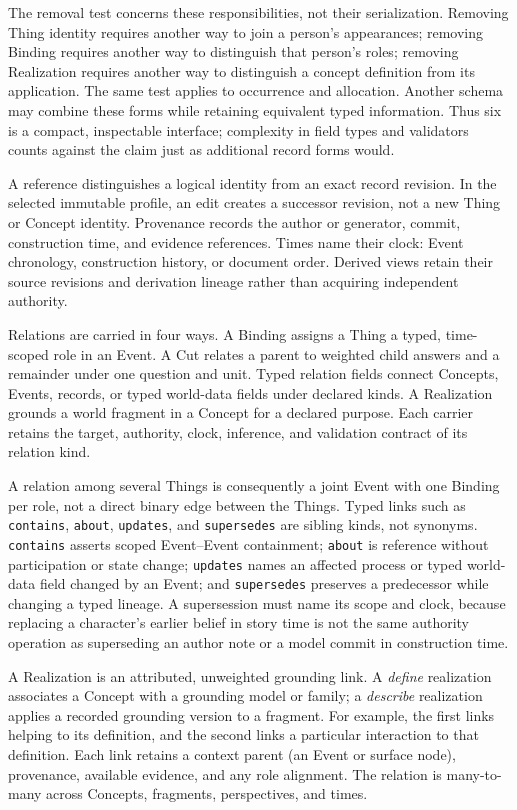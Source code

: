 \documentclass[11pt,a4paper]{article}
\begin{document}
The removal test concerns these responsibilities, not their serialization.
Removing Thing identity requires another way to join a person's appearances;
removing Binding requires another way to distinguish that person's roles;
removing Realization requires another way to distinguish a concept definition
from its application. The same test applies to occurrence and allocation.
Another schema may combine these forms while retaining equivalent typed
information. Thus six is a compact, inspectable interface; complexity in field types and validators counts
against the claim just as additional record forms would.

\MMCoreSchema

A reference distinguishes a logical identity from an exact record revision.
In the selected immutable profile, an edit creates a successor revision, not a
new Thing or Concept identity. Provenance records the author or generator,
commit, construction time, and evidence references. Times name their clock:
Event chronology, construction history, or document order. Derived views retain
their source revisions and derivation lineage rather than acquiring independent
authority.

Relations are carried in four ways. A Binding assigns a Thing a typed,
time-scoped role in an Event. A Cut relates a parent to weighted child answers
and a remainder under one question and unit. Typed relation fields connect
Concepts, Events, records, or typed world-data fields under declared kinds. A
Realization grounds a world fragment in a Concept for a declared purpose. Each carrier retains the target,
authority, clock, inference, and validation contract of its relation kind.

A relation among several Things is consequently a joint Event with one Binding
per role, not a direct binary edge between the Things. Typed links such as
\texttt{contains}, \texttt{about}, \texttt{updates}, and \texttt{supersedes}
are sibling kinds, not synonyms. \texttt{contains} asserts scoped
Event--Event containment; \texttt{about} is reference without participation or
state change; \texttt{updates} names an affected process or typed world-data
field changed by an Event; and \texttt{supersedes} preserves a predecessor while changing a
typed lineage. A supersession must name its scope and clock, because replacing
a character's earlier belief in story time is not the same authority operation
as superseding an author note or a model commit in construction time.

A Realization is an attributed, unweighted grounding link. A \emph{define}
realization associates a Concept with a grounding model or family; a
\emph{describe} realization applies a recorded grounding version to a fragment.
For example, the first links helping to its definition, and the second links a
particular interaction to that definition. Each link retains a context parent
(an Event or surface node), provenance, available evidence, and any role
alignment. The relation is many-to-many across Concepts, fragments, perspectives,
and times.
\end{document}
